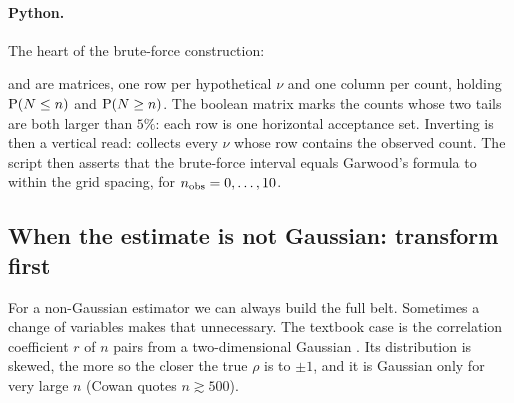 \paragraph{Python.}
The heart of the brute-force construction:


 and  are matrices, one row per hypothetical $\nu$ and
one column per count, holding $\operatorname{P}(N\le n)$ and $\operatorname{P}(N\ge n)$. The boolean
matrix  marks the counts whose two tails are both larger than
$5\%$: each row is one horizontal acceptance set. Inverting is then a vertical
read:  collects every $\nu$ whose row contains the
observed count. The script then asserts that the brute-force interval equals
Garwood's formula to within the grid spacing, for $n_{\rm obs}=0,\dots,10$.

\subsection{When the estimate is not Gaussian: transform first}
\label{4b:sec:fisher-z}

For a non-Gaussian estimator we can always build the full belt. Sometimes a
change of variables makes that unnecessary. The textbook case is the
correlation coefficient $r$ of $n$ pairs from a two-dimensional Gaussian
. Its distribution is skewed, the more so the closer the
true $\rho$ is to $\pm1$, and it is Gaussian only for very large $n$ (Cowan
quotes $n\gtrsim500$).

